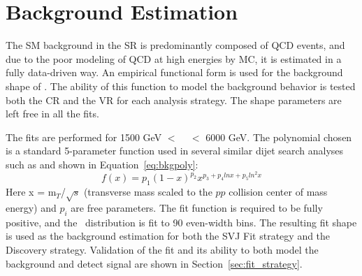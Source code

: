 \section{Background Estimation}
\label{sec:background}


The SM background in the SR is predominantly composed of QCD events, and due to the poor modeling of QCD at high energies by MC, it is estimated in a fully data-driven way. 
An empirical functional form is used for the background shape of \mt.
The ability of this function to model the background behavior is tested both the CR and the VR for each analysis strategy. The shape parameters are left free in all the fits.

The fits are performed for 1500 GeV $<$ \mt~ $<$ 6000 GeV.
The polynomial chosen is a standard 5-parameter function used in several similar dijet search analyses such as \cite{darkjets} \cite{smooth_bkg} \cite{cms_svj} and shown in Equation~\ref{eq:bkgpoly}:
\begin{equation}
f(x) = p_1(1-x)^{p_2}x^{p_3+p_4 lnx+p_5ln^2x}
\label{eq:bkgpoly}
\end{equation}
Here x = m$_{T}$/$\sqrt{s}$ (transverse mass scaled to the $pp$ collision center of mass energy) and $p_i$ are free parameters.
The fit function is required to be fully positive, and the \mt~distribution is fit to 90 even-width bins.
The resulting fit shape is used as the background estimation for both the SVJ Fit strategy and the Discovery strategy. 
Validation of the fit and its ability to both model the background and detect signal are shown in Section~\ref{sec:fit_strategy}.


